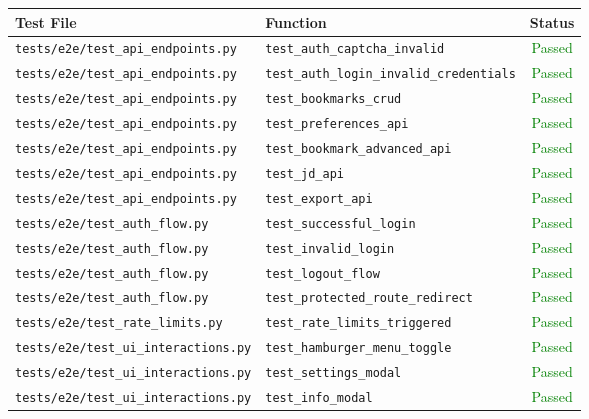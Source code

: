 \begin{table}[H]
  \centering
  \begin{tabular}{|l|l|c|}
    \hline
    \textbf{Test File} & \textbf{Function} & \textbf{Status} \\
    \hline
    \texttt{tests/e2e/test\_api\_endpoints.py} & \texttt{test\_auth\_captcha\_invalid} & \textcolor{green}{Passed} \\
    \hline
    \texttt{tests/e2e/test\_api\_endpoints.py} & \texttt{test\_auth\_login\_invalid\_credentials} & \textcolor{green}{Passed} \\
    \hline
    \texttt{tests/e2e/test\_api\_endpoints.py} & \texttt{test\_bookmarks\_crud} & \textcolor{green}{Passed} \\
    \hline
    \texttt{tests/e2e/test\_api\_endpoints.py} & \texttt{test\_preferences\_api} & \textcolor{green}{Passed} \\
    \hline
    \texttt{tests/e2e/test\_api\_endpoints.py} & \texttt{test\_bookmark\_advanced\_api} & \textcolor{green}{Passed} \\
    \hline
    \texttt{tests/e2e/test\_api\_endpoints.py} & \texttt{test\_jd\_api} & \textcolor{green}{Passed} \\
    \hline
    \texttt{tests/e2e/test\_api\_endpoints.py} & \texttt{test\_export\_api} & \textcolor{green}{Passed} \\
    \hline
    \texttt{tests/e2e/test\_auth\_flow.py} & \texttt{test\_successful\_login} & \textcolor{green}{Passed} \\
    \hline
    \texttt{tests/e2e/test\_auth\_flow.py} & \texttt{test\_invalid\_login} & \textcolor{green}{Passed} \\
    \hline
    \texttt{tests/e2e/test\_auth\_flow.py} & \texttt{test\_logout\_flow} & \textcolor{green}{Passed} \\
    \hline
    \texttt{tests/e2e/test\_auth\_flow.py} & \texttt{test\_protected\_route\_redirect} & \textcolor{green}{Passed} \\
    \hline
    \texttt{tests/e2e/test\_rate\_limits.py} & \texttt{test\_rate\_limits\_triggered} & \textcolor{green}{Passed} \\
    \hline
    \texttt{tests/e2e/test\_ui\_interactions.py} & \texttt{test\_hamburger\_menu\_toggle} & \textcolor{green}{Passed} \\
    \hline
    \texttt{tests/e2e/test\_ui\_interactions.py} & \texttt{test\_settings\_modal} & \textcolor{green}{Passed} \\
    \hline
    \texttt{tests/e2e/test\_ui\_interactions.py} & \texttt{test\_info\_modal} & \textcolor{green}{Passed} \\

\end{tabular}
\end{table}
